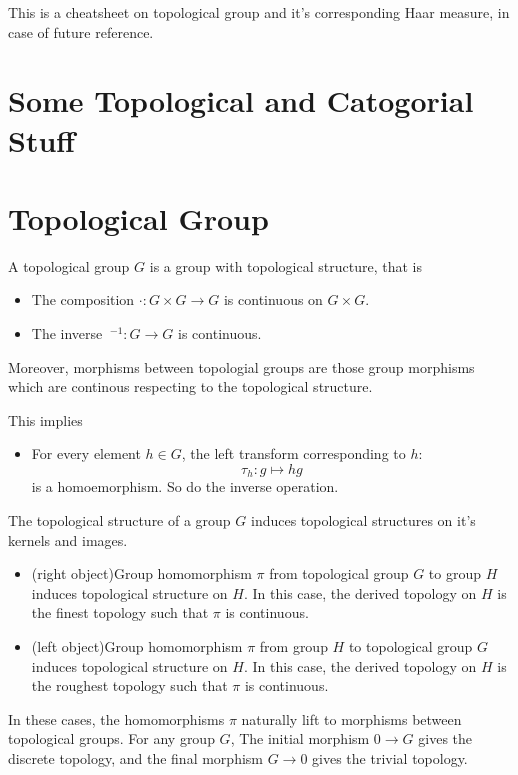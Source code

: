 \documentclass[12pt,a4paper]{article}
\begin{document}
This is a cheatsheet on topological group and it's corresponding Haar measure, in case of future reference.

\section{Some Topological and Catogorial Stuff}

\section{Topological Group}
A topological group $G$ is a group with topological structure, that is
\begin{itemize}
    \item The composition $\cdot: G\times G\rightarrow G$ is continuous on $G\times G$.
    \item The inverse $\ ^{-1}: G\rightarrow G$ is continuous.
\end{itemize}

Moreover, morphisms between topologial groups are those group morphisms which are continous respecting to the topological structure.

This implies
\begin{itemize}
    \item For every element $h\in G$, the left transform corresponding to $h$:
        \[\tau_h: g\mapsto hg\]
        is a homoemorphism. So do the inverse operation.
\end{itemize}

The topological structure of a group $G$ induces topological structures on it's kernels and images.
\begin{itemize}
    \item (right object)Group homomorphism $\pi$ from topological group $G$ to group $H$ induces topological structure on $H$. In this case, the derived topology on $H$ is the finest topology such that $\pi$ is continuous.
    \item (left object)Group homomorphism $\pi$ from group $H$ to topological group $G$ induces topological structure on $H$. In this case, the derived topology on $H$ is the roughest topology such that $\pi$ is continuous.
\end{itemize}
In these cases, the homomorphisms $\pi$ naturally lift to morphisms between topological groups. For any group $G$, The initial morphism $0\rightarrow G$ gives the discrete topology, and the final morphism $G\rightarrow 0$ gives the trivial topology.
\end{document}
